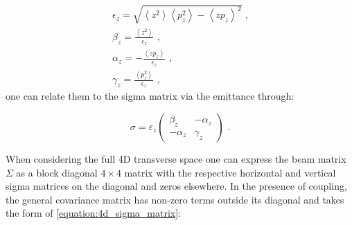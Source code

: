\begin{equation}
    \begin{gathered}
        \epsilon_z = \sqrt{\left\langle z^2 \right\rangle \left\langle p_z^2 \right\rangle - \left\langle z p_z \right\rangle^2}  \text{ ,}  \\
        \beta_z    = \frac{\left\langle z^2 \right\rangle}{\epsilon_z}                                                            \text{ ,}  \\
        \alpha_z   = -\frac{\left\langle z p_z \right\rangle}{\epsilon_z}                                                         \text{ ,}  \\
        \gamma_z   = \frac{\left\langle p_z^2 \right\rangle}{\epsilon_z}                                                          \text{ ,}
    \end{gathered}
\end{equation}
one can relate them to the sigma matrix via the emittance through:

\begin{equation}
    \sigma = \varepsilon_z \begin{pmatrix}
        \beta_z & - \alpha_z \\
        - \alpha_z & \gamma_z
    \end{pmatrix}  \text{ .}
    \label{equation:2d_sigma_matrix_to_twiss_parameters}
\end{equation}
\vspace{1pt}

\noindent
When considering the full \num{4}D transverse space one can express the beam matrix \(\Sigma\) as a block diagonal \(4 \times 4\) matrix with the respective horizontal and vertical sigma matrices on the diagonal and zeros elsewhere.
In the presence of coupling, the general covariance matrix has non-zero terms outside its diagonal and takes the form of \cref{equation:4d_sigma_matrix}:

